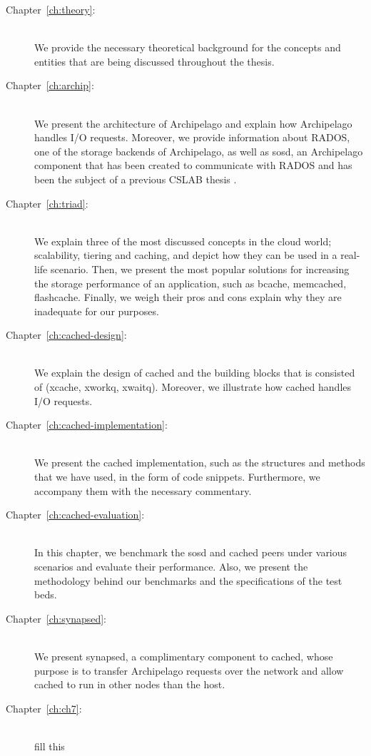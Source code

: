 \begin{description}
\item[Chapter~\ref{ch:theory}:] \hfill \\
	We provide the necessary theoretical background for the concepts and 
	entities that are being discussed throughout the thesis.
\item[Chapter~\ref{ch:archip}:] \hfill \\
	We present the architecture of Archipelago and explain how Archipelago 
	handles I/O requests. Moreover, we provide information about RADOS, one 
	of the storage backends of Archipelago, as well as sosd, an Archipelago 
	component that has been created to communicate with RADOS and has been 
	the subject of a previous CSLAB thesis \cite{philipgian}.
\item[Chapter~\ref{ch:triad}:] \hfill \\
	We explain three of the most discussed concepts in the cloud world; 
	scalability, tiering and caching, and depict how they can be used in a 
	real-life scenario. Then, we present the most popular solutions for 
	increasing the storage performance of an application, such as bcache, 
	memcached, flashcache. Finally, we weigh their pros and cons explain 
	why they are inadequate for our purposes.
\item[Chapter~\ref{ch:cached-design}:] \hfill \\
	We explain the design of cached and the building blocks that is 
	consisted of (xcache, xworkq, xwaitq). Moreover, we illustrate how 
	cached handles I/O requests.
\item[Chapter~\ref{ch:cached-implementation}:] \hfill \\
	We present the cached implementation, such as the structures and 
	methods that we have used, in the form of code snippets. Furthermore, 
	we accompany them with the necessary commentary.
\item[Chapter~\ref{ch:cached-evaluation}:] \hfill \\
	In this chapter, we benchmark the sosd and cached peers under various 
	scenarios and evaluate their performance. Also, we present the 
	methodology behind our benchmarks and the specifications of the test 
	beds.
\item[Chapter~\ref{ch:synapsed}:] \hfill \\
	We present synapsed, a complimentary component to cached, whose purpose 
	is to transfer Archipelago requests over the network and allow cached 
	to run in other nodes than the host.
\item[Chapter~\ref{ch:ch7}:] \hfill \\
	\todo fill this
\end{description}
